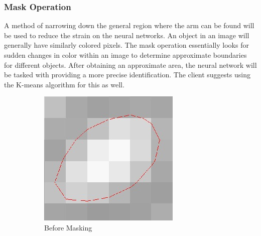\documentclass[10pt,journal,compsoc, draftclsnofoot,onecolumn]{IEEEtran}
\begin{document}
\subsubsection{Mask Operation}
A method of narrowing down the general region where the arm can be found will be used to reduce the strain on the neural networks.
An object in an image will generally have similarly colored pixels.
The mask operation essentially looks for sudden changes in color within an image to determine approximate boundaries for different objects.
After obtaining an approximate area, the neural network will be tasked with providing a more precise identification.
The client suggests using the K-means algorithm for this as well.

\begin{figure}[h!]
    \centering
    \begin{subfigure}[b]{0.15\textwidth}
        \includegraphics[width=\textwidth]{unmasked.jpg}
        \caption{Before Masking}
    \end{subfigure}
    ~ %
    \begin{subfigure}[b]{0.15\textwidth}

\end{subfigure}
\end{figure}
\end{document}
